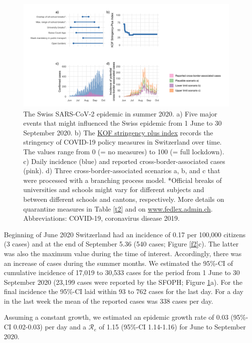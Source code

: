 \documentclass[10pt, a4paper, twoside]{article}
\begin{document}
\begin{multicols}{2}
\begin{figure}
\centering
\includegraphics[scale=0.15]{Figure1_2021-06-02.png}
\caption{The Swiss SARS-CoV-2 epidemic in summer 2020.
a) Five major events that might influenced the Swiss epidemic from 1 June to 30 September 2020.
b) The \href{https://kof.ethz.ch/en/forecasts-and-indicators/indicators/kof-stringency-index.html}{KOF stringency plus index} records the stringency of COVID-19 policy measures in Switzerland over time.
The values range from 0 (= no measures) to 100 (= full lockdown).
c) Daily incidence (blue) and reported cross-border-associated cases (pink).
d) Three cross-border-associated scenarios a, b, and c that were processed with a branching process model.
*Official breaks of universities and schools might vary for different subjects and between different schools and cantons, respectively.
More details on quarantine measures in Table \ref{t2} and on \href{https://www.fedlex.admin.ch/eli/cc/2021/61/de}{www.fedlex.admin.ch}.
Abbreviations: COVID-19, coronavirus disease 2019.}
\label{f1}
\end{figure}

Beginning of June 2020 Switzerland had an incidence of 0.17 per 100,000 citizens (3 cases) and at the end of September 5.36 (540 cases; Figure \ref{f2}c).
The latter was also the maximum value during the time of interest.
Accordingly, there was an increase of cases during the summer months.
We estimated the 95\%-CI of cumulative incidence of 17,019 to 30,533 cases for the period from 1 June to 30 September 2020 (23,199 cases were reported by the SFOPH; Figure \ref{f1}a).
For the final incidence the 95\%-CI laid within 93 to 762 cases for the last day.
For a day in the last week the mean of the reported cases was 338 cases per day.

Assuming a constant growth, we estimated an epidemic growth rate of 0.03 (95\%-CI 0.02-0.03) per day and a $\mathcal{R}_e$ of 1.15 (95\%-CI 1.14-1.16) for June to September 2020.



\end{multicols}
\end{document}
